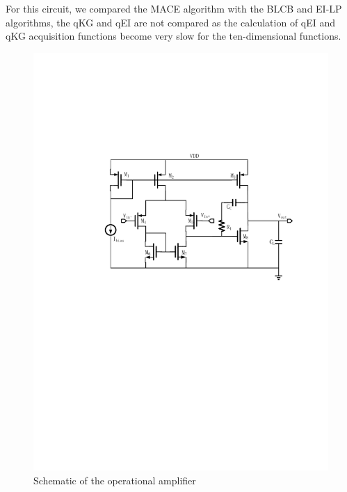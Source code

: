 For this circuit, we compared the MACE algorithm with the BLCB and EI-LP
algorithms, the qKG and qEI are not compared as the calculation of qEI and qKG
acquisition functions become very slow for the ten-dimensional functions. 


\begin{figure}[h]
    \begin{center}
        \centerline{\includegraphics[width=\columnwidth]{./img/sopam.pdf}}
        \caption{Schematic of the operational amplifier}
        \label{fig:schDAC2014}
    \end{center}
\end{figure}

